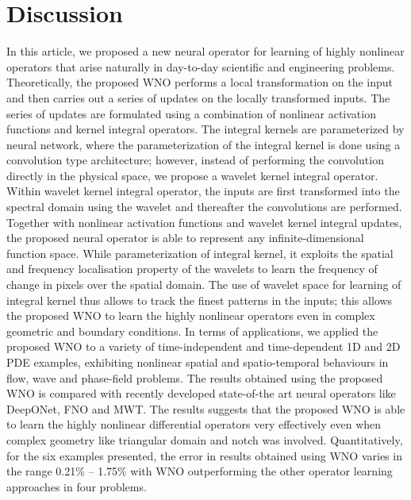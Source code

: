 \documentclass{article}
\begin{document}
\section*{Discussion}
In this article, we proposed a new neural operator for learning of highly nonlinear operators that arise naturally in day-to-day scientific and engineering problems. Theoretically, the proposed WNO performs a local transformation on the input and then carries out a series of updates on the locally transformed inputs. The series of updates are formulated using a combination of nonlinear activation functions and kernel integral operators. The integral kernels are parameterized by neural network, where the parameterization of the integral kernel is done using a convolution type architecture; however, instead of performing the convolution directly in the physical space, we propose a wavelet kernel integral operator. Within wavelet kernel integral operator, 
the inputs are first transformed into the spectral domain using the wavelet and thereafter the convolutions are performed. Together with nonlinear activation functions and wavelet kernel integral updates, the proposed neural operator is able to represent any infinite-dimensional function space.
While parameterization of integral kernel, it exploits the spatial and frequency localisation property of the wavelets to learn the frequency of change in pixels over the spatial domain. The use of wavelet space for learning of integral kernel thus allows to track the finest patterns in the inputs; this allows the proposed WNO to learn the highly nonlinear operators even in complex geometric and boundary conditions. In terms of applications, we applied the proposed WNO to a variety of time-independent and time-dependent 1D and 2D PDE examples, exhibiting nonlinear spatial and spatio-temporal behaviours in flow, wave and phase-field problems.
The results obtained using the proposed WNO is compared with recently developed state-of-the art neural operators like DeepONet, FNO and MWT. The results suggests that the proposed WNO is able to learn the highly nonlinear differential operators very effectively even when complex geometry like triangular domain and notch was involved.
Quantitatively, for the six examples presented, the error in results obtained using WNO varies in the range 0.21\% -- 1.75\% with WNO outperforming the other operator learning approaches in four problems.
\end{document}
